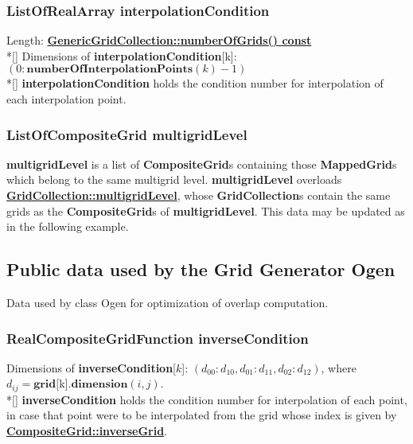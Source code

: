 \documentclass{article}
\begin{document}
  \subsubsection{ListOfRealArray interpolationCondition}
  \label{CompositeGrid::interpolationCondition}
    Length: {\bf{}\hyperref{numberOfGrids()}{numberOfGrids() \rm(\S}{)}{GenericGridCollection::numberOfGrids() const}} \\*[\parskip]
    Dimensions of \textbf{interpolationCondition}[k]: $(0\colon\textbf{numberOfInterpolationPoints}(k)-1)$ \\*[\parskip]
    \textbf{interpolationCondition} holds the condition number for interpolation of each interpolation point.

  \subsubsection{ListOfCompositeGrid multigridLevel} 
  \label{CompositeGrid::multigridLevel} 
    \textbf{multigridLevel} is a list of \textbf{CompositeGrid}s containing those \textbf{MappedGrid}s which belong to the same multigrid level.
    \textbf{multigridLevel} overloads
    {\bf{}\hyperref{GridCollection::multigridLevel}{GridCollection::multigridLevel \rm(\S}{)}{GridCollection::multigridLevel}},
    whose \textbf{GridCollection}s contain the same grids as the \textbf{CompositeGrid}s of \textbf{multigridLevel}.
    This data may be updated as in the following example.

\subsection{Public data used by the Grid Generator Ogen}
\label{CompositeGrid::PublicCgshData}

Data used by class Ogen for optimization of overlap computation.

  \subsubsection{RealCompositeGridFunction inverseCondition}
  \label{CompositeGrid::inverseCondition}
    Dimensions of \textbf{inverseCondition}[$k$]: $(d_{00}\colon d_{10},d_{01}\colon d_{11},d_{02}\colon d_{12})$,
    where $d_{ij} = \textbf{grid}[$k$].\textbf{dimension}(i,j)$. \\*[\parskip]
    \textbf{inverseCondition} holds the condition number for interpolation of each point, in case that point were to be interpolated from the
    grid whose index is given by {\bf{}\hyperref{inverseGrid}{inverseGrid \rm(\S}{)}{CompositeGrid::inverseGrid}}.
\end{document}
